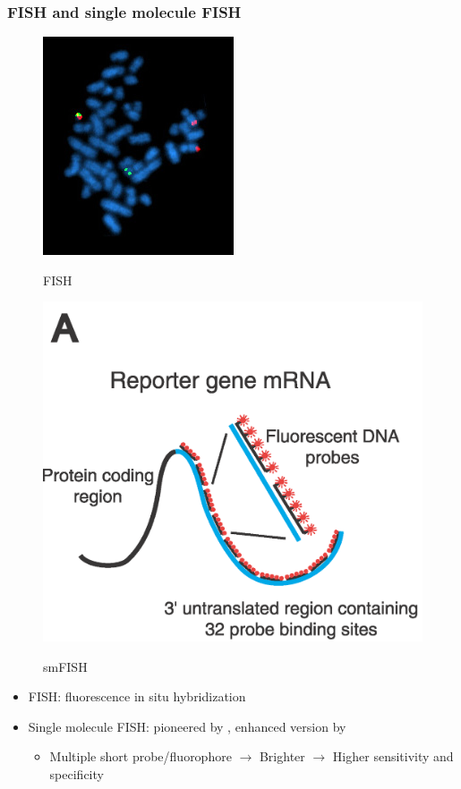 \documentclass{beamer}
\begin{document}
  \begin{frame}
  \frametitle{FISH and single molecule FISH}
  \begin{figure}
    \centering
    \begin{minipage}{.5\textwidth}
        \centering
        \includegraphics[width=0.45\linewidth]{Bcrablmet}
        \caption{FISH} \cite{wiki:Fluorescence_in_situ_hybridization}
    \end{minipage}%
    \begin{minipage}{0.5\textwidth}
        \centering
        \includegraphics[width=0.6\linewidth]{smfish}
        \caption{smFISH} \cite{raj2006stochastic}
    \end{minipage}
  \end{figure}
  \begin{itemize}
    \item FISH: fluorescence in situ hybridization
    \item Single molecule FISH: pioneered by \cite{femino1998visualization}, enhanced version by \cite{raj2006stochastic}
      \begin{itemize}
        \item Multiple short probe/fluorophore $\rightarrow$ Brighter $\rightarrow$ Higher sensitivity and specificity
      \end{itemize}
  \end{itemize}
  \end{frame}
\end{document}

